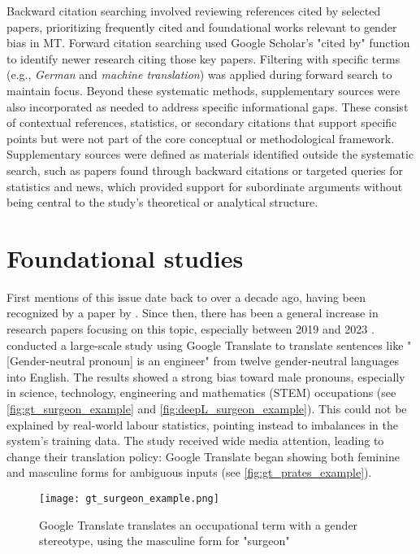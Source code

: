     Backward citation searching involved reviewing references cited by selected papers, prioritizing frequently cited and foundational works relevant to gender bias in MT. Forward citation searching used Google Scholar's "cited by" function to identify newer research citing those key papers. Filtering with specific terms (e.g., \textit{German} and \textit{machine translation}) was applied during forward search to maintain focus. Beyond these systematic methods, supplementary sources were also incorporated as needed to address specific informational gaps. These consist of contextual references, statistics, or secondary citations that support specific points but were not part of the core conceptual or methodological framework. Supplementary sources were defined as materials identified outside the systematic search, such as papers found through backward citations or targeted queries for statistics and news, which provided support for subordinate arguments without being central to the study's theoretical or analytical structure. 

    \section{Foundational studies}
        First mentions of this issue date back to over a decade ago, having been recognized by a paper by \textcite{schiebingerScientificResearchMust2014}. Since then, there has been a general increase in research papers focusing on this topic, especially between 2019 and 2023 \parencite{savoldiDecadeGenderBias2025}. \textcite{pratesAssessingGenderBias2019} conducted a large-scale study using Google Translate to translate sentences like "[Gender-neutral pronoun] is an engineer" from twelve gender-neutral languages into English. The results showed a strong bias toward male pronouns, especially in science, technology, engineering and mathematics (STEM) occupations (see \autoref{fig:gt_surgeon_example} and \ref{fig:deepL_surgeon_example}). This could not be explained by real-world labour statistics, pointing instead to imbalances in the system's training data. The study received wide media attention, leading \citeauthor{googleReducingGenderBias2018} to change their translation policy: Google Translate began showing both feminine and masculine forms for ambiguous inputs \parencite{googleReducingGenderBias2018} (see \autoref{fig:gt_prates_example}).

        \vspace{0.8em}
        \begin{figure}[htb]
            \centering
            \texttt{[image: gt\_surgeon\_example.png]}
            \caption[Example of Google Translate's biased translation]{Google Translate translates an occupational term with a gender stereotype, using the masculine form for "surgeon"}
            \label{fig:gt_surgeon_example}
        \end{figure}

